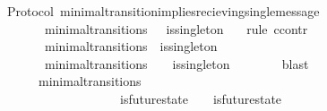 \begin{isabellebody}
\isanewline
\isanewline
{}\isamarkupfalse%
\ {\isacharparenleft}\ Protocol{\isacharparenright}\ minimal{\isacharunderscore}transition{\isacharunderscore}implies{\isacharunderscore}recieving{\isacharunderscore}single{\isacharunderscore}message\ {\isacharcolon}\isanewline
\ \ {\isachardoublequoteopen}{\isasymforall}\ {\isasymsigma}\ {\isasymsigma}{\isacharprime}{\isachardot}\ {\isacharparenleft}{\isasymsigma}{\isacharcomma}\ {\isasymsigma}{\isacharprime}{\isacharparenright}\ {\isasymin}\ minimal{\isacharunderscore}transitions\ \ {\isasymlongrightarrow}\ is{\isacharunderscore}singleton\ {\isacharparenleft}{\isasymsigma}{\isacharprime}{\isacharminus}\ {\isasymsigma}{\isacharparenright}{\isachardoublequoteclose}\isanewline
%
\isadelimproof
%
\endisadelimproof
%
\isatagproof
{}\isamarkupfalse%
\ {\isacharparenleft}rule\ ccontr{\isacharparenright}\isanewline
\ \ \isamarkupfalse%
\ {\isachardoublequoteopen}{\isasymnot}\ {\isacharparenleft}{\isasymforall}\ {\isasymsigma}\ {\isasymsigma}{\isacharprime}{\isachardot}\ {\isacharparenleft}{\isasymsigma}{\isacharcomma}\ {\isasymsigma}{\isacharprime}{\isacharparenright}\ {\isasymin}\ minimal{\isacharunderscore}transitions\ {\isasymlongrightarrow}\ is{\isacharunderscore}singleton\ {\isacharparenleft}{\isasymsigma}{\isacharprime}{\isacharminus}\ {\isasymsigma}{\isacharparenright}{\isacharparenright}{\isachardoublequoteclose}\isanewline
\ \ \isamarkupfalse%
\ \isamarkupfalse%
\ \ {\isachardoublequoteopen}{\isasymexists}\ {\isasymsigma}\ {\isasymsigma}{\isacharprime}{\isachardot}\ {\isacharparenleft}{\isasymsigma}{\isacharcomma}\ {\isasymsigma}{\isacharprime}{\isacharparenright}\ {\isasymin}\ minimal{\isacharunderscore}transitions\ {\isasymand}\ {\isasymnot}\ \ is{\isacharunderscore}singleton\ {\isacharparenleft}{\isasymsigma}{\isacharprime}{\isacharminus}\ {\isasymsigma}{\isacharparenright}{\isachardoublequoteclose}\isanewline
\ \ \ \ \isamarkupfalse%
\ blast\isanewline
\ \ \isamarkupfalse%
\ {\isachardoublequoteopen}{\isasymforall}\ {\isasymsigma}\ {\isasymsigma}{\isacharprime}{\isachardot}\ {\isacharparenleft}{\isasymsigma}{\isacharcomma}\ {\isasymsigma}{\isacharprime}{\isacharparenright}\ {\isasymin}\ minimal{\isacharunderscore}transitions\ {\isasymlongrightarrow}\isanewline
\ \ \ \ \ \ \ \ \ \ \ \ \ \ {\isacharparenleft}{\isasymnexists}\ {\isasymsigma}{\isacharprime}{\isacharprime}{\isachardot}\ {\isasymsigma}{\isacharprime}{\isacharprime}\ {\isasymin}\ {\isasymSigma}\ {\isasymand}\ is{\isacharunderscore}future{\isacharunderscore}state\ {\isacharparenleft}{\isasymsigma}{\isacharcomma}\ {\isasymsigma}{\isacharprime}{\isacharprime}{\isacharparenright}\ {\isasymand}\ is{\isacharunderscore}future{\isacharunderscore}state\ {\isacharparenleft}{\isasymsigma}{\isacharprime}{\isacharprime}{\isacharcomma}\ {\isasymsigma}{\isacharprime}{\isacharparenright}\ {\isasymand}\ {\isasymsigma}\ {\isasymnoteq}\ {\isasymsigma}{\isacharprime}{\isacharprime}\ {\isasymand}\ {\isasymsigma}{\isacharprime}{\isacharprime}\ {\isasymnoteq}\ {\isasymsigma}{\isacharprime}{\isacharparenright}{\isachardoublequoteclose}\isanewline

\end{isabellebody}
